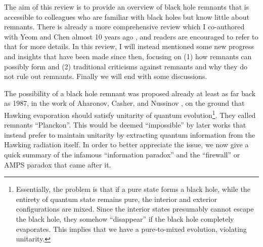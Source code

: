 \documentclass[12pt,preprintnumbers, floatfix, preprintnumbers, letterpaper, superscriptaddress,nofootinbib]{revtex4-2}
\begin{document}
The aim of this review is to provide an overview of black hole remnants that is accessible to colleagues who are familiar with black holes but know little about remnants. There is already a more comprehensive review which I co-authored with Yeom and Chen almost 10 years ago \cite{1412.8366}, and readers are encouraged to refer to that for more details. In this review, I will instead mentioned some new progress and insights that have been made since then, focusing on (1) how remnants can possibly form and (2) traditional criticisms against remnants and why they do not rule out remnants. Finally we will end with some discussions. 

The possibility of a black hole remnant was proposed already at least as far back as 1987, in the work of Aharonov, Casher, and Nussinov \cite{ACN}, on the ground that Hawking evaporation should satisfy unitarity of quantum evolution\footnote{Essentially, the problem is that if a pure state forms a black hole, while the entirety of quantum state remains pure, the interior and exterior configurations are mixed. Since the interior states presumably cannot escape the black hole, they somehow ``disappear'' if the black hole completely evaporates. This implies that we have a pure-to-mixed evolution, violating unitarity.}. They called remnants ``Planckon''. This would be deemed ``impossible'' by later works that instead prefer to maintain unitarity by extracting quantum information from the Hawking radiation itself. In order to better appreciate the issue, we now give a quick summary of the infamous ``information paradox'' and the ``firewall'' or AMPS paradox \cite{1207.3123,1304.6483} that came after it.
\goodbreak
\end{document}
